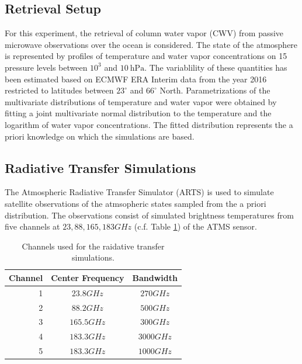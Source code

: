 \documentclass[journal abbreviation, manuscript]{copernicus}
\begin{document}
\subsection{Retrieval Setup}

   For this experiment, the retrieval of column water vapor (CWV) from passive
   microwave observations over the ocean is considered. The state of the
   atmosphere is represented by profiles of temperature and water vapor
   concentrations on 15 pressure levels between $10^3$ and $\SI{10}{\hecto
   \pascal}$. The variablility of these quantities has been estimated based on
   ECMWF ERA Interim data \citep{era_interim} from the year 2016 restricted to
   latitudes between $23^\circ$ and $66^\circ$ North. Parametrizations of the
   multivariate distributions of temperature and water vapor were obtained by
   fitting a joint multivariate normal distribution to the temperature and the
   logarithm of water vapor concentrations. The fitted distribution represents
   the a priori knowledge on which the simulations are based.

\subsection{Radiative Transfer Simulations}

   The Atmospheric Radiative Transfer Simulator (ARTS) \citep{arts} is used to
   simulate satellite observations of the atmsopheric states sampled from the a
   priori distribution. The observations consist of simulated brightness
   temperatures from five channels at $23, 88, 165, 183 \unit{GHz}$
   (c.f. Table \ref{tab:channels}) of the ATMS sensor.

\begin{table}[hbpt]
\centering
\begin{tabular}{|r|c|c|}
    \hline
    Channel & Center Frequency           & Bandwidth                \\ 
    \hline
                  1 & $23.8 \unit{GHz}$ & $270 \unit{GHz}$ \\
                  2 & $88.2 \unit{GHz}$ & $500 \unit{GHz}$ \\
                  3 & $165.5\unit{GHz}$ & $300 \unit{GHz}$ \\
                  4 & $183.3\unit{GHz}$ & $3000\unit{GHz}$ \\
                  5 & $183.3\unit{GHz}$ & $1000\unit{GHz}$ \\
    \hline
\end{tabular}
\caption{Channels used for the raidative transfer simulations.}
\label{tab:channels}
\end{table}
\end{document}
